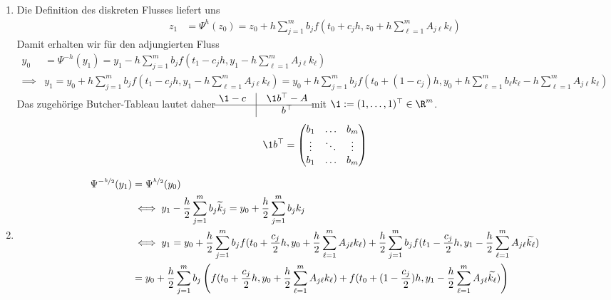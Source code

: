 \begin{solution}
\begin{enumerate}[label = \textbf{\alph*)}]
  \item
  Die Definition des diskreten Flusses liefert uns
  \begin{align*}
    z_1 &= \Psi^h(z_0) = z_0 + h\sum_{j=1}^mb_jf(t_0+c_jh,z_0+h\sum_{\ell = 1}^m A_{j\ell}k_{\ell})
  \end{align*}
  Damit erhalten wir für den adjungierten Fluss
  \begin{align*}
    y_0 &= \Psi^{-h}(y_1) = y_1 - h\sum_{j=1}^mb_jf(t_1-c_jh,y_1-h\sum_{\ell = 1}^m A_{j\ell}k_{\ell}) \\
    \implies& y_1 = y_0 + h\sum_{j=1}^mb_jf(t_1 - c_jh,y_1-h\sum_{\ell = 1}^m A_{j\ell}k_{\ell})
    = y_0 + h\sum_{j=1}^mb_jf(t_0 + (1-c_j)h,y_0 + h\sum_{\ell=1}^mb_{\ell}k_{\ell} - h\sum_{\ell = 1}^m A_{j\ell}k_{\ell})
  \end{align*}
  Das zugehörige Butcher-Tableau lautet daher
    \renewcommand{\arraystretch}{1.2}
    $\begin{matrix}
    \1 - c& \vline & \1 b^{\top} - A\\
    \hline
     & \vline & b^{\top}
    \end{matrix}$
  mit $\1 := (1,\dots,1)^{\top} \in \R^m$.
  \begin{align*}
    \1 b^{\top} = \begin{pmatrix}
      b_1 & \hdots & b_m \\
      \vdots & \ddots & \vdots \\
      b_1 & \hdots & b_m
    \end{pmatrix}
  \end{align*}
  \item \begin{align*}
    \Psi^{-\nicefrac{h}{2}}(y_1) &= \Psi^{\nicefrac{h}{2}}(y_0) \\
    &\iff y_1 -  \frac{h}{2}\sum_{j=1}^mb_j\widetilde{k}_j = y_0 + \frac{h}{2}\sum_{j=1}^mb_jk_j \\
    &\iff y_1 = y_0 + \frac{h}{2}\sum_{j=1}^mb_jf(t_0 + \frac{c_j}{2}h,y_0+\frac{h}{2}\sum_{\ell = 1}^m A_{j\ell}k_{\ell})
    + \frac{h}{2}\sum_{j=1}^mb_jf(t_1 -\frac{c_j}{2}h,y_1-\frac{h}{2}\sum_{\ell = 1}^m A_{j\ell}\widetilde{k_{\ell}}) \\
    &= y_0 + \frac{h}{2}\sum_{j=1}^mb_j\left(f(t_0 + \frac{c_j}{2}h, y_0+\frac{h}{2}\sum_{\ell = 1}^m A_{j\ell}k_{\ell})+
    f(t_0 + (1-\frac{c_j}{2})h,y_1 - \frac{h}{2}\sum_{\ell = 1}^m A_{j\ell}\widetilde{k_{\ell}})\right) \\

\end{align*}
\end{enumerate}
\end{solution}
